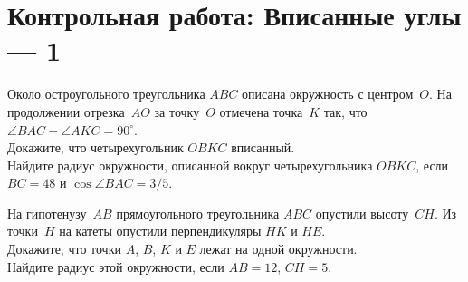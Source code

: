 
\section*{Контрольная работа: Вписанные углы --- 1}


\begin{problems}

\item
Около остроугольного треугольника $ABC$ описана окружность с центром~$O$.
На продолжении отрезка~$AO$ за точку~$O$ отмечена точка~$K$ так, что
$\angle BAC + \angle AKC = 90^\circ$.
\\
\subproblem
Докажите, что четырехугольник $OBKC$ вписанный.
\\
\subproblem
Найдите радиус окружности, описанной вокруг четырехугольника $OBKC$, если
$BC = 48$ и $\cos \angle BAC = 3/5$.

\item
На гипотенузу~$AB$ прямоугольного треугольника $ABC$ опустили высоту~$CH$.
Из точки~$H$ на катеты опустили перпендикуляры $HK$ и $HE$.
\\
\subproblem
Докажите, что точки $A$, $B$, $K$ и $E$ лежат на одной окружности.
\\
\subproblem
Найдите радиус этой окружности, если $AB = 12$, $CH = 5$.

\end{problems}

